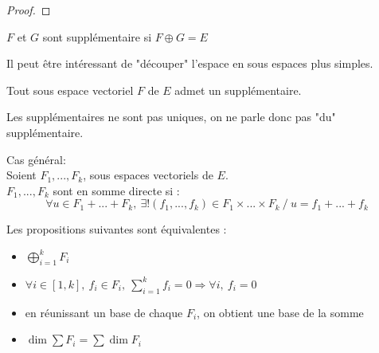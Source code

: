 \documentclass[../main.tex]{subfile}
\begin{document}
\begin{proof}
\end{proof}

\begin{defi}
	$F$ et $G$ sont supplémentaire si $F \oplus G = E$
\end{defi}

\begin{rema}
	Il peut être intéressant de "découper" l'espace en sous espaces plus simples.
\end{rema}

\begin{rema}
	Tout sous espace vectoriel $F$ de $E$ admet un supplémentaire.
\end{rema}

\begin{rema}
	Les supplémentaires ne sont pas uniques, on ne parle donc pas "du" supplémentaire.
\end{rema}

Cas général:\\
Soient $F_1, ..., F_k$, sous espaces vectoriels de $E$.\\
$F_1, ..., F_k$ sont en somme directe si :
$$\forall u \in F_1 + ... + F_k, \ \exists! (f_1, ..., f_k) \in F_1 \times ... \times F_k \ / \ u = f_1 + ... + f_k$$

\begin{prop}
	Les propositions suivantes sont équivalentes :
\begin{itemize}	
	\item $\bigoplus\limits_{i = 1}^k F_i$ 
	\item $\forall i \in [1, k], \ f_i \in F_i, \ \sum\limits_{i = 1}^k f_i = 0 \Rightarrow \forall i, \ f_i = 0$
	\item en réunissant un base de chaque $F_i$, on obtient une base de la somme
	\item $\dim \sum F_i = \sum \dim F_i$
\end{itemize}
\end{prop}

\end{document}
